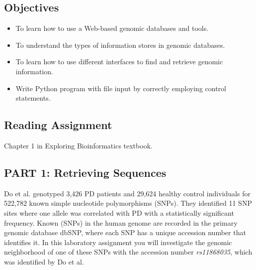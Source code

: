 

\long{}



\subsection*{Objectives}
\begin{itemize}
	\item To learn how to use a Web-based genomic databases and tools.
	\item To understand the types of information stores in genomic databases.
	\item To learn how to use different interfaces to find and retrieve genomic information. 
	\item Write Python program with file input by correctly employing control statements. 
\end{itemize}

\vspace*{-.1in}
\subsection*{Reading Assignment}
\vspace*{-.1in}
Chapter 1 in Exploring Bioinformatics textbook.

\vspace*{-.1in}
\subsection*{PART 1: Retrieving Sequences}
\vspace*{-.1in} 
Do et al. genotyped 3,426 PD patients and 29,624 healthy control individuals for 522,782 known simple nucleotide polymorphisms (SNPs). They identified 11 SNP sites where one allele was correlated with PD with a statistically significant frequency. Known (SNPs) in the human genome are recorded in the primary genomic database dbSNP, where each SNP has a unique accession number that identifies it. In this laboratory assignment you will investigate the genomic neighborhood of one of these SNPs with the accession number \emph{rs11868035}, which was identified by Do et al. 

